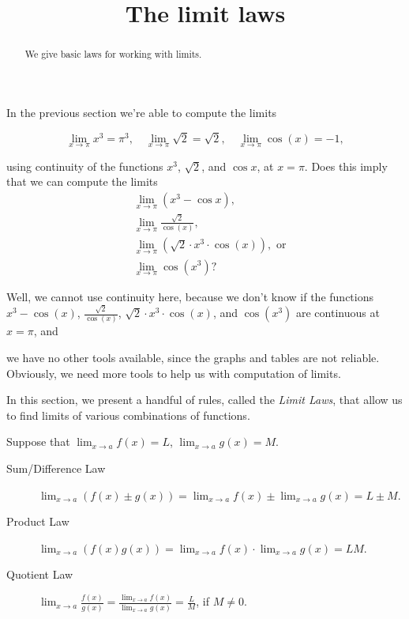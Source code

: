 \documentclass{ximera}
\title[Dig-In:]{The limit laws}
\begin{document}
\begin{abstract}
We give basic laws for working with limits. 
\end{abstract}
\maketitle
In the previous section we're able to compute the limits

\[
\lim_{x\to \pi} x^3=\pi^3,\quad\lim_{x\to \pi} \sqrt{2}=\sqrt{2},\quad\lim_{x\to \pi} \cos(x)= -1,
\]

using continuity of the functions $x^3$, $\sqrt{2}$, and $\cos{x}$, at
$x=\pi$.  Does this imply that we can compute the limits
\begin{align*}
  &\lim_{x\to \pi} (x^3-\cos{x}),\\
  &\lim_{x\to \pi} \frac{\sqrt{2}}{\cos(x)},\\
  &\lim_{x\to \pi} (\sqrt{2}\cdot x^3\cdot\cos(x)), \text{ or}\\
  &\lim_{x\to \pi} \cos({x^3})?
\end{align*}

Well, we cannot use continuity here, because we don't know if the
functions $x^3-\cos(x)$, $\frac{\sqrt{2}}{\cos(x)}$, $\sqrt{2}\cdot
x^3\cdot\cos(x)$, and $\cos({x^3})$ are continuous at $x=\pi$, and

 we have no other tools available, since the graphs and tables are not reliable. Obviously, we need more tools to help us with computation of limits.

 

In this section, we present a handful of rules, called the \textit{Limit Laws},
that allow us to find limits of various combinations of functions.

\begin{theorem}\label{theorem:limit-laws}
Suppose that $\lim_{x\to a}f(x)=L$, $\lim_{x\to a}g(x)=M$.
\begin{description}
\item[Sum/Difference Law] $\lim_{x\to a} (f(x) \pm g(x)) =
  \lim_{x\to a}f(x) \pm \lim_{x\to a}g(x)=L \pm M$.
\item[Product Law]  $\lim_{x\to a} (f(x)g(x)) = \lim_{x\to
  a}f(x)\cdot\lim_{x\to a}g(x)=LM$.
\item[Quotient Law]  $\lim_{x\to a} \frac{f(x)}{g(x)} =
  \frac{\lim_{x\to a}f(x)}{\lim_{x\to a}g(x)}=\frac{L}{M}$, if
  $M\ne0$.
\end{description}
\label{thm:limit laws}
\end{theorem}
\end{document}
